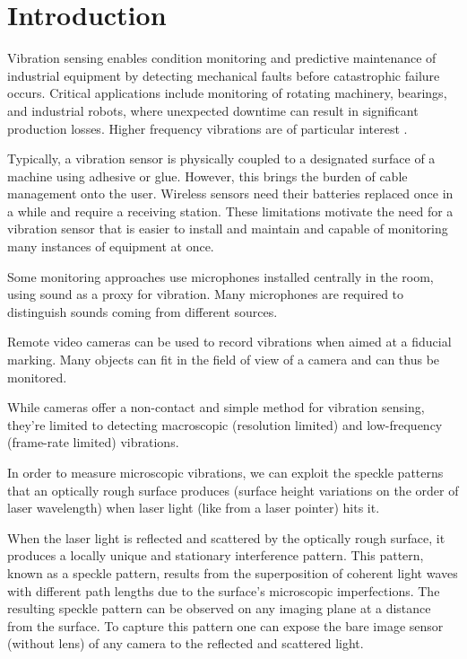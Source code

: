 \section{Introduction}
\label{sec:intro}

Vibration sensing enables condition monitoring and predictive maintenance of industrial equipment by detecting mechanical faults before catastrophic failure occurs. Critical applications include monitoring of rotating machinery, bearings, and industrial robots, where unexpected downtime can result in significant production losses. Higher frequency vibrations are of particular interest \cite{cm-highfreq}.

Typically, a vibration sensor is physically coupled to a designated surface of a machine using adhesive or glue. However, this brings the burden of cable management onto the user. Wireless sensors need their batteries replaced once in a while and require a receiving station. These limitations motivate the need for a vibration sensor that is easier to install and maintain and capable of monitoring many instances of equipment at once.

Some monitoring approaches use microphones installed centrally in the room, using sound as a proxy for vibration. Many microphones are required to distinguish sounds coming from different sources.

Remote video cameras can be used to record vibrations \cite{camvibration} when aimed at a fiducial marking. Many objects can fit in the field of view of a camera and can thus be monitored. 

While cameras offer a non-contact and simple method for vibration sensing, they're limited to detecting macroscopic (resolution limited) and low-frequency (frame-rate limited) vibrations.

In order to measure microscopic vibrations, we can exploit the speckle patterns that an optically rough surface produces (surface height variations on the order of laser wavelength) when laser light (like from a laser pointer) hits it.

When the laser light is reflected and scattered by the optically rough surface, it produces a locally unique and stationary interference pattern. This pattern, known as a speckle pattern, results from the superposition of coherent light waves with different path lengths due to the surface's microscopic imperfections. The resulting speckle pattern can be observed on any imaging plane at a distance from the surface. To capture this pattern one can expose the bare image sensor (without lens) of any camera to the reflected and scattered light.

